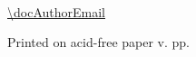 
\thispagestyle{empty}

\begingroup

\footnotesize

\noindent{\it\docProject}%

\bigskip

\noindent\docAuthor      \\[1.5mm]
\url{\docAuthorEmail}

\vfill

%
%
%

\noindent Printed on acid-free paper \hfill{\docToday\quad v. \docVersion\xspace\quad pp.\pageref{LastPage}}

\endgroup

